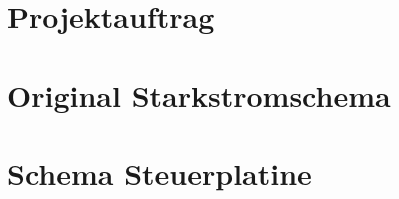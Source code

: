 \chapter{Projektauftrag}


\chapter{Original Starkstromschema}\label{schema_original}


\chapter{Schema Steuerplatine}\label{Anh_Steuerplatine}


